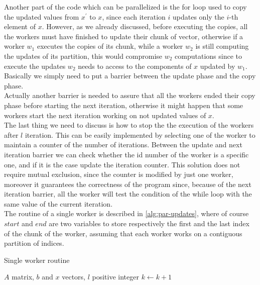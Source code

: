 \documentclass[12pt]{article}
\begin{document}
	Another part of the code which can be parallelized is the for loop used to copy the updated values from $x^\prime$ to $x$, since each iteration $i$ updates only the $i$-th element of $x$. However, as we already discussed, before executing the copies, all the workers must have finished to update their chunk of vector, otherwise if a worker $w_1$ executes the copies of its chunk, while a worker $w_2$ is still computing the updates of its partition, this would compromise $w_2$ computations since to execute the updates $w_2$ needs to access to the components of $x$ updated by $w_1$. Basically we simply need to put a barrier between the update phase and the copy phase.\\
	Actually another barrier is needed to assure that all the workers ended their copy phase before starting the next iteration, otherwise it might happen that some workers start the next iteration working on not updated values of $x$.\\
	The last thing we need to discuss is how to stop the the execution of the workers after $l$ iteration. This can be easily implemented by selecting one of the worker to maintain a counter of the number of iterations. Between the update and next iteration barrier we can check whether the id number of the worker is a specific one, and if it is the case update the iteration counter. This solution does not require mutual exclusion, since the counter is modified by just one worker, moreover it guarantees the correctness of the program since, because of the next iteration barrier, all the worker will test the condition of the while loop with the same value of the current iteration. \\
	The routine of a single worker is described in \ref{alg:par-updates}, where of course $start$ and $end$ are two variables to store respectively the first and the last index of the chunk of the worker, assuming that each worker works on a contiguous partition of indices.
	\begin{algorithm}[H]
		\caption{Single worker routine}\label{alg:par-updates}
		\begin{algorithmic}
			\Require $A$ matrix, $b$ and $x$ vectors, $l$ positive integer
				\EndFor
			\EndFor
			\EndFor
			$k\leftarrow k + 1$
			\EndIf
			\EndWhile
		\end{algorithmic}
	\end{algorithm}
	
\end{document}
